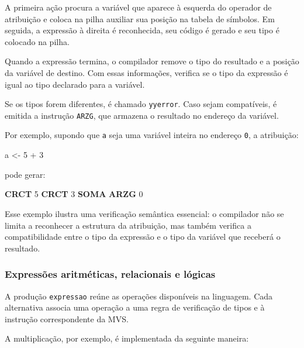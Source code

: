 \documentclass[
  brazilian,
  letterpaper,
]{book}
\newenvironment{Shaded}{\begin{snugshade}}{\end{snugshade}}
\newcommand{\DecValTok}[1]{\textcolor[rgb]{0.68,0.00,0.00}{#1}}
\newcommand{\KeywordTok}[1]{\textcolor[rgb]{0.00,0.23,0.31}{\textbf{#1}}}
\newcommand{\NormalTok}[1]{\textcolor[rgb]{0.00,0.23,0.31}{#1}}
\theoremstyle{plain}
\theoremstyle{definition}
\theoremstyle{remark}
\begin{document}
A primeira ação procura a variável que aparece à esquerda do operador de
atribuição e coloca na pilha auxiliar sua posição na tabela de símbolos.
Em seguida, a expressão à direita é reconhecida, seu código é gerado e
seu tipo é colocado na pilha.

Quando a expressão termina, o compilador remove o tipo do resultado e a
posição da variável de destino. Com essas informações, verifica se o
tipo da expressão é igual ao tipo declarado para a variável.

Se os tipos forem diferentes, é chamado \texttt{yyerror}. Caso sejam
compatíveis, é emitida a instrução \texttt{ARZG}, que armazena o
resultado no endereço da variável.

Por exemplo, supondo que \texttt{a} seja uma variável inteira no
endereço \texttt{0}, a atribuição:

\begin{Shaded}
\begin{Highlighting}[]
\NormalTok{a \textless{}{-} }\DecValTok{5}\NormalTok{ + }\DecValTok{3}
\end{Highlighting}
\end{Shaded}

pode gerar:

\begin{Shaded}
\begin{Highlighting}[]
     \KeywordTok{CRCT}    \DecValTok{5}
     \KeywordTok{CRCT}    \DecValTok{3}
     \KeywordTok{SOMA}
     \KeywordTok{ARZG}    \DecValTok{0}
\end{Highlighting}
\end{Shaded}

Esse exemplo ilustra uma verificação semântica essencial: o compilador
não se limita a reconhecer a estrutura da atribuição, mas também
verifica a compatibilidade entre o tipo da expressão e o tipo da
variável que receberá o resultado.

\subsubsection{Expressões aritméticas, relacionais e
lógicas}\label{expressuxf5es-aritmuxe9ticas-relacionais-e-luxf3gicas}

A produção \texttt{expressao} reúne as operações disponíveis na
linguagem. Cada alternativa associa uma operação a uma regra de
verificação de tipos e à instrução correspondente da MVS.

A multiplicação, por exemplo, é implementada da seguinte maneira:
\end{document}
